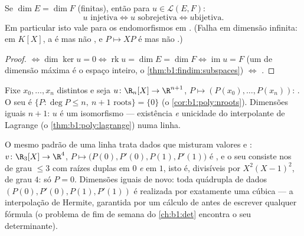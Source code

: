 \begin{corollary}\label{cor:b1:linmaps:samedim}
Se $\dim E = \dim F$ (finitas), então para $u \in \mathcal{L}(E, F)$:
\[
u \text{ injetiva} \iff u \text{ sobrejetiva} \iff u \text{bijetiva}.
\]
Em particular isto vale para os endomorfismos em .
(Falha em dimensão infinita: em $K[X]$, a  é  mas
não , e $P \mapsto XP$ é  mas não .)
\end{corollary}

\begin{proof}
 $\iff \dim\ker u = 0 \iff \operatorname{rk} u = \dim E =
\dim F \iff \operatorname{im} u = F$ (um  de dimensão máxima é o espaço inteiro,
o \cref{thm:b1:findim:subspaces}) $\iff$ .
\end{proof}

\begin{example}\label{ex:b1:linmaps:interpolation}
Fixe $x_0, \dots, x_n$ distintos e seja $u \colon \R_n[X] \to
\R^{n+1}$, $P \mapsto (P(x_0), \dots, P(x_n))$: . O seu  é
$\{P : \deg P \leq n,\ n+1 \text{ roots}\} = \{0\}$ (o \cref{cor:b1:poly:nroots}). Dimensões iguais $n + 1$: $u$ é um isomorfismo ---
existência \emph{e} unicidade do interpolante de Lagrange (o \cref{thm:b1:poly:lagrange})
numa linha.

O mesmo padrão de uma linha trata dados que misturam valores e
: $v \colon \R_3[X] \to \R^4$, $P \mapsto \bigl(P(0),
P'(0), P(1), P'(1)\bigr)$ é , e o seu  consiste nos
 de grau $\leq 3$ com raízes duplas em $0$ \emph{e} em
$1$, isto é, divisíveis por $X^2(X-1)^2$, de grau $4$: só $P = 0$.
Dimensões iguais de novo: toda quádrupla de dados $(P(0),
P'(0), P(1), P'(1))$ é realizada
por exatamente uma cúbica --- a interpolação de Hermite, garantida
por um cálculo de  antes de escrever qualquer fórmula (o
problema de fim de semana do \cref{ch:b1:det} encontra o seu determinante).
\end{example}

